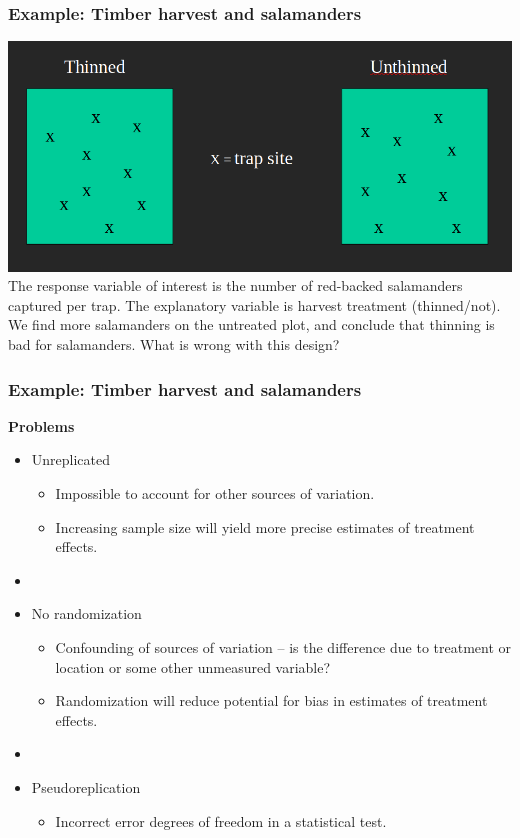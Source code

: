 \documentclass[color=usenames,dvipsnames]{beamer}\usepackage[]{graphicx}\usepackage[]{color}
\begin{document}
\begin{frame}
  \frametitle{Example: Timber harvest and salamanders}
  \includegraphics[width=\textwidth]{salamander-design} \\
  \vfill
  The response variable of interest is the number of red-backed
  salamanders captured per trap.  The explanatory variable is harvest
  treatment (thinned/not). We find more salamanders on the untreated
  plot, and conclude that thinning is bad for salamanders.  What is
  wrong with this design?  
\end{frame}


\begin{frame}
  \frametitle{Example: Timber harvest and salamanders}
  {\bf Problems}
  \begin{itemize}
    \item Unreplicated
      \begin{itemize}
      \item Impossible to account for other sources of variation.
      \item Increasing sample size will yield more precise estimates
        of treatment effects.
        \end{itemize}
    \item[]
    \item<2-> No randomization
      \begin{itemize}
        \item Confounding of sources of variation -- is the difference
          due to treatment or location or some other unmeasured variable? 
        \item Randomization will reduce potential for bias in
          estimates of treatment effects.
      \end{itemize}      
    \item[]
    \item<3-> Pseudoreplication
      \begin{itemize}
      \item Incorrect error degrees of freedom in a statistical test.
      \end{itemize}
    \end{itemize}
\end{frame}
\end{document}

